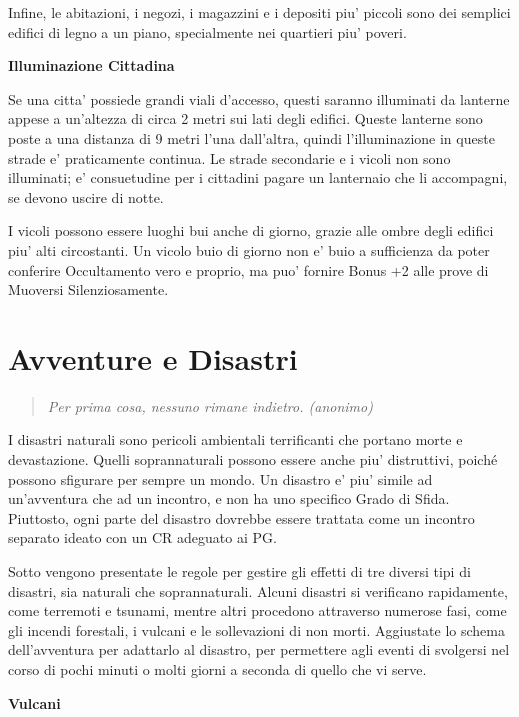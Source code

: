 \documentclass[a4paper,11pt,twoside,openany]{book}
\begin{document}
{Infine, le abitazioni, i negozi, i magazzini e i depositi piu' piccoli sono dei semplici edifici di legno a un piano, specialmente nei quartieri piu' poveri.

\textbf{Illuminazione Cittadina}

Se una citta' possiede grandi viali d'accesso, questi saranno illuminati da lanterne appese a un'altezza di circa 2 metri sui lati degli edifici. Queste lanterne sono poste a una distanza di 9 metri l'una dall'altra, quindi l'illuminazione in queste strade e' praticamente continua. Le strade secondarie e i vicoli non sono illuminati; e' consuetudine per i cittadini pagare un lanternaio che li accompagni, se devono uscire di notte.

I vicoli possono essere luoghi bui anche di giorno, grazie alle ombre degli edifici piu' alti circostanti. Un vicolo buio di giorno non e' buio a sufficienza da poter conferire Occultamento vero e proprio, ma puo' fornire Bonus +2 alle prove di Muoversi Silenziosamente.

\pagebreak

\section{Avventure e Disastri}

\label{avventure-e-disastri}
\begin{quote}\textit{
Per prima cosa, nessuno rimane indietro. (anonimo)
}\end{quote}
I disastri naturali sono pericoli ambientali terrificanti che portano morte e devastazione. Quelli soprannaturali posso­no essere anche piu' distruttivi, poiché possono sfigurare per sempre un mondo. Un disastro e' piu' simile ad un'avventura che ad un incontro, e non ha uno specifico Grado di Sfida. Piuttosto, ogni parte del disastro dovrebbe essere trattata come un incontro separato ideato con un CR adeguato ai PG.

Sotto vengono presentate le regole per gestire gli effetti di tre diversi tipi di disastri, sia naturali che soprannaturali. Alcuni disastri si verificano rapidamente, come terremoti e tsunami, mentre altri procedono attraverso numerose fasi, come gli incendi forestali, i vulcani e le sollevazioni di non morti. Aggiustate lo schema dell'avventura per adattarlo al disastro, per permettere agli eventi di svolgersi nel corso di pochi minuti o molti giorni a seconda di quello che vi serve.

\textbf{Vulcani}

}
\end{document}
